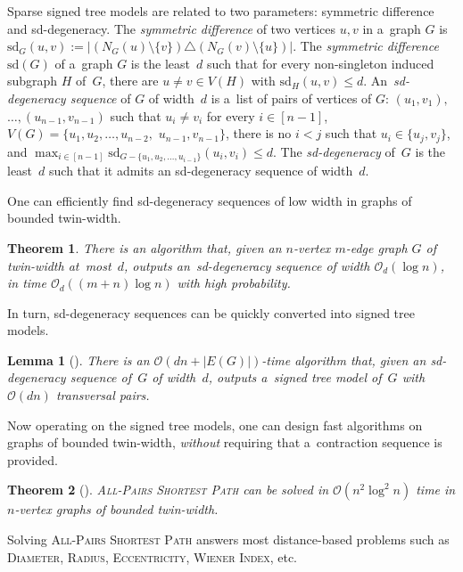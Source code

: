 \documentclass[a4paper,11pt]{article}
\newcommand\sd{\text{sd}}
\newcommand{\Oh}{\mathcal{O}}
\newtheorem{theorem}{Theorem}
\newtheorem{lemma}{Lemma}
\begin{document}
Sparse signed tree models are related to two parameters: symmetric difference and sd-degeneracy.
The \emph{symmetric difference} of two vertices $u, v$ in a~graph $G$ is $\sd_G(u,v) := |(N_G(u) \setminus \{v\}) \triangle (N_G(v) \setminus \{u\})|$.
The \emph{symmetric difference} $\sd(G)$ of a~graph $G$ is the least~$d$ such that for every non-singleton induced subgraph $H$ of~$G$, there are $u \neq v \in V(H)$ with $\sd_H(u,v) \leqslant d$.
An~\emph{sd-degeneracy sequence} of $G$ of width~$d$ is a~list of pairs of vertices of $G$: $(u_1, v_1),$ $\ldots, (u_{n-1},v_{n-1})$ such that $u_i \neq v_i$ for every $i \in [n-1]$, $V(G) = \{u_1, u_2, \ldots, u_{n-2},$ $u_{n-1}, v_{n-1}\}$, there is no $i < j$ such that $u_i \in \{u_j, v_j\}$, and $\max_{i \in [n-1]} \sd_{G - \{u_1, u_2, \ldots, u_{i-1}\}}(u_i,v_i) \leqslant d$.
The \emph{sd-degeneracy} of~$G$ is the least~$d$ such that it admits an sd-degeneracy sequence of width~$d$.

One can efficiently find sd-degeneracy sequences of low width in graphs of bounded twin-width. 

\begin{theorem}\label{thm:vers-tww-to-sd}
  There is an algorithm that, given an $n$-vertex $m$-edge graph $G$ of twin-width at~most~$d$, outputs an~sd-degeneracy sequence of width $\Oh_d(\log n)$, in time $\Oh_d((m+n) \log n)$ with high probability.
\end{theorem}

In turn, sd-degeneracy sequences can be quickly converted into signed tree models.

\begin{lemma}[\cite{BonnetGKM26}]\label{lem:sd-degen-to-stm}
  There is an $\Oh(dn+|E(G)|)$-time algorithm that, given an sd-degeneracy sequence of~$G$ of width~$d$, outputs a~signed tree model of~$G$ with $\Oh(dn)$ transversal pairs.  
\end{lemma}

Now operating on the signed tree models, one can design fast algorithms on graphs of bounded twin-width, \emph{without} requiring that a~contraction sequence is provided.

\begin{theorem}[\cite{BonnetGKM26}]\label{thm:APSP-tww}
  \textsc{All-Pairs Shortest Path} can be solved in $\Oh(n^2 \log^2 n)$ time in $n$-vertex graphs of bounded twin-width. 
\end{theorem}

Solving \textsc{All-Pairs Shortest Path} answers most distance-based problems such as \textsc{Diameter}, \textsc{Radius}, \textsc{Eccentricity}, \textsc{Wiener Index}, etc.
\end{document}
